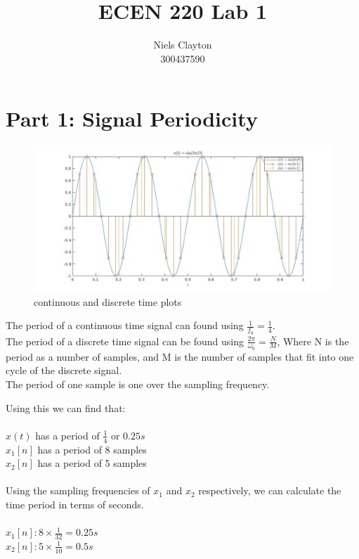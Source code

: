 \documentclass[a4paper,11pt]{article}
\begin{document}
\title{\LARGE{\textbf{ECEN 220 Lab 1}}}
\author{Niels Clayton \\300437590}
\date{}
\maketitle

\section*{Part 1: Signal Periodicity}
\begin{figure}[h]
\centering
\includegraphics[width=\linewidth]{2.jpg}
\caption{continuous and discrete time plots}
\end{figure}
The period of a continuous time signal can found using $\frac{1}{f_0}=\frac{1}{4}$.\\
The period of a discrete time signal can be found using $\frac{2\pi}{\omega_0} = \frac{N}{M}$, Where N is the period as a number of samples, and M is the number of samples that fit into one cycle of the discrete signal.\\
The period of one sample is one over the sampling frequency.

Using this we can find that:\\ \\
 $x(t)$ has a period of $\frac{1}{4}$ or $0.25s$\\
$x_1[n]$ has a period of 8 samples\\
$x_2[n]$ has a period of 5 samples\\ \\

Using the sampling frequencies of $x_1$ and $x_2$ respectively, we can calculate the time period in terms of seconds. \\ \\
$x_1[n] : 8 \times \frac{1}{32} = 0.25s $ \\
$x_2[n] : 5 \times \frac{1}{10} = 0.5s$ \\ \\
\end{document}
